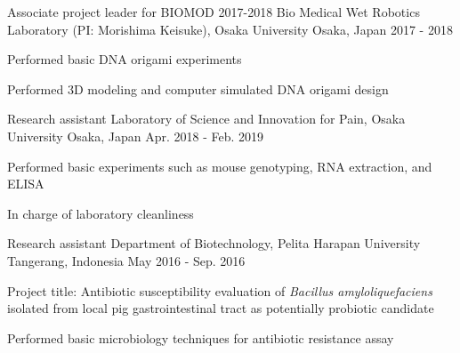 \begin{cventries}
  \cventry
  {Associate project leader for BIOMOD 2017-2018} %
  {Bio Medical Wet Robotics Laboratory (PI: Morishima Keisuke), Osaka University} %
  {Osaka, Japan} %
  {2017 - 2018} %
  {
    \begin{cvitems} %
      \item {Performed basic DNA origami experiments}
      \item {Performed 3D modeling and computer simulated DNA origami design}
    \end{cvitems}
  }


  \cventry
  {Research assistant} %
  {Laboratory of Science and Innovation for Pain, Osaka University} %
  {Osaka, Japan} %
  {Apr. 2018 - Feb. 2019} %
  {
    \begin{cvitems} %
      \item {Performed basic experiments such as mouse genotyping, RNA extraction, and ELISA}
      \item {In charge of laboratory cleanliness}
    \end{cvitems}
  }
 

  \cventry
  {Research assistant} %
  {Department of Biotechnology, Pelita Harapan University} %
  {Tangerang, Indonesia} %
  {May 2016 - Sep. 2016} %
  {
    \begin{cvitems} %
      \item {Project title: Antibiotic susceptibility evaluation of \emph{Bacillus amyloliquefaciens} isolated
      from local pig gastrointestinal tract as potentially probiotic candidate}
      \item {Performed basic microbiology techniques for antibiotic resistance assay}
    \end{cvitems}
  }

\end{cventries}
